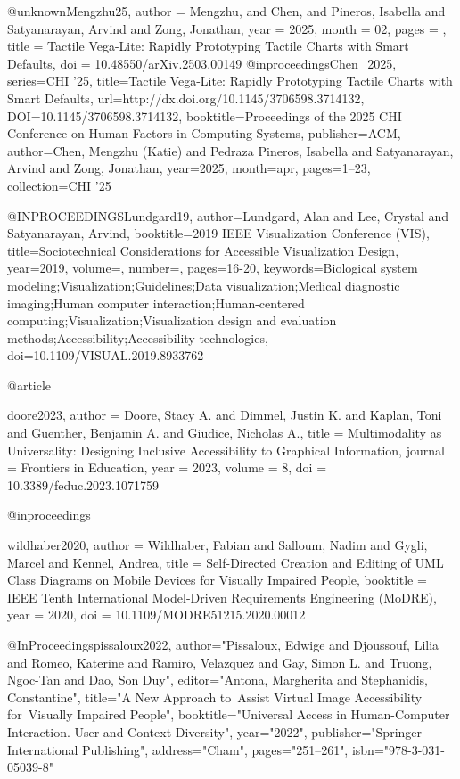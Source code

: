 @unknown{Mengzhu25,
author = {Mengzhu, and Chen, and Pineros, Isabella and Satyanarayan, Arvind and Zong, Jonathan},
year = {2025},
month = {02},
pages = {},
title = {Tactile Vega-Lite: Rapidly Prototyping Tactile Charts with Smart Defaults},
doi = {10.48550/arXiv.2503.00149}
}
@inproceedings{Chen_2025, series={CHI ’25},
   title={Tactile Vega-Lite: Rapidly Prototyping Tactile Charts with Smart Defaults},
   url={http://dx.doi.org/10.1145/3706598.3714132},
   DOI={10.1145/3706598.3714132},
   booktitle={Proceedings of the 2025 CHI Conference on Human Factors in Computing Systems},
   publisher={ACM},
   author={Chen, Mengzhu (Katie) and Pedraza Pineros, Isabella and Satyanarayan, Arvind and Zong, Jonathan},
   year={2025},
   month=apr, pages={1–23},
   collection={CHI ’25} }



@INPROCEEDINGS{Lundgard19,
  author={Lundgard, Alan and Lee, Crystal and Satyanarayan, Arvind},
  booktitle={2019 IEEE Visualization Conference (VIS)}, 
  title={Sociotechnical Considerations for Accessible Visualization Design}, 
  year={2019},
  volume={},
  number={},
  pages={16-20},
  keywords={Biological system modeling;Visualization;Guidelines;Data visualization;Medical diagnostic imaging;Human computer interaction;Human-centered computing;Visualization;Visualization design and evaluation methods;Accessibility;Accessibility technologies},
  doi={10.1109/VISUAL.2019.8933762}}


@article{doore2023,
  author = {Doore, Stacy A. and Dimmel, Justin K. and Kaplan, Toni and Guenther, Benjamin A. and Giudice, Nicholas A.},
  title = {Multimodality as Universality: Designing Inclusive Accessibility to Graphical Information},
  journal = {Frontiers in Education},
  year = {2023},
  volume = {8},
  doi = {10.3389/feduc.2023.1071759}
  
}
@inproceedings{wildhaber2020,
  author = {Wildhaber, Fabian and Salloum, Nadim and Gygli, Marcel and Kennel, Andrea},
  title = {Self-Directed Creation and Editing of UML Class Diagrams on Mobile Devices for Visually Impaired People},
  booktitle = {IEEE Tenth International Model-Driven Requirements Engineering (MoDRE)},
  year = {2020},
  doi = {10.1109/MODRE51215.2020.00012}

}

@InProceedings{pissaloux2022,
author="Pissaloux, Edwige
and Djoussouf, Lilia
and Romeo, Katerine
and Ramiro, Velazquez
and Gay, Simon L.
and Truong, Ngoc-Tan
and Dao, Son Duy",
editor="Antona, Margherita and Stephanidis, Constantine",
title="A New Approach to Assist Virtual Image Accessibility for Visually Impaired People",
booktitle="Universal Access in Human-Computer Interaction. User and Context Diversity",
year="2022",
publisher="Springer International Publishing",
address="Cham",
pages="251--261",
isbn="978-3-031-05039-8"
}


